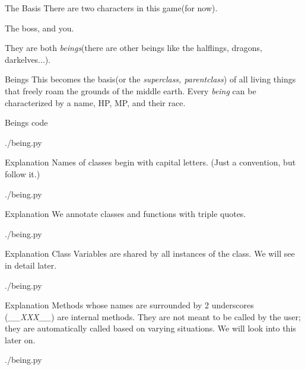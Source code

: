 \documentclass{beamer}
\begin{document}
\begin{frame}{The Basis}
  There are two characters in this game(for now).

  The boss, and you.

  They are both \textit{beings}(there are other beings like the halflings,
  dragons, darkelves...).
\end{frame}

\begin{frame}{Beings}
  This becomes the basis(or the \textit{superclass, parentclass}) of all living things that freely
  roam the grounds of the middle earth.  Every \textit{being} can be
  characterized by a name, HP, MP, and their race.
\end{frame}

\begin{frame}{Beings code}
  \begin{lstinputlisting}[firstline=1, lastline=23]
    {./being.py}
  \end{lstinputlisting}
\end{frame}

\begin{frame}{Explanation}
  Names of classes begin with capital letters. (Just a convention, but follow
  it.)
  \begin{lstinputlisting}[firstline=1, lastline=1]
    {./being.py}
  \end{lstinputlisting}
\end{frame}

\begin{frame}{Explanation}
  We annotate classes and functions with triple quotes.
  \begin{lstinputlisting}[firstline=1, lastline=2]
    {./being.py}
  \end{lstinputlisting}
\end{frame}

\begin{frame}{Explanation}
  Class Variables are shared by all instances of the class.
  We will see in detail later.
  \begin{lstinputlisting}[firstline=1, lastline=5]
    {./being.py}
  \end{lstinputlisting}
\end{frame}


\begin{frame}{Explanation}
  Methods whose names are surrounded by 2 underscores
  (\textit{\_\_XXX\_\_}) are
  internal methods.
  They are not meant to be called by the user; they are
  automatically called based on varying situations. We will look into this
  later on.
  \begin{lstinputlisting}[firstline=1, lastline=7]
    {./being.py}
  \end{lstinputlisting}
\end{frame}
\end{document}
